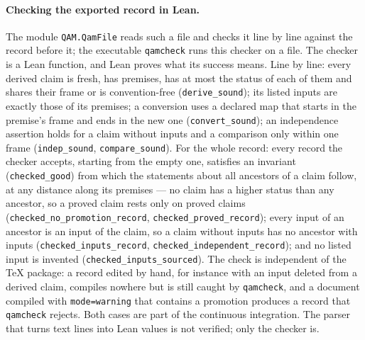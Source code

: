 \paragraph{Checking the exported record in Lean.}  The module \texttt{QAM.QamFile} reads such a file and checks it line by line
against the record before it; the executable \texttt{qamcheck} runs this checker on a file.  The checker is a Lean function, and Lean
proves what its success means.  Line by line: every derived claim is fresh, has premises, has at most the status of each of them and
shares their frame or is convention-free (\texttt{derive\_sound}); its listed inputs are exactly those of its premises; a conversion uses a
declared map that starts in the premise's frame and ends in the new one (\texttt{convert\_sound}); an independence assertion holds for a
claim without inputs and a comparison only within one frame (\texttt{indep\_sound}, \texttt{compare\_sound}).  For the whole record:
every record the checker accepts, starting from the empty one, satisfies an invariant (\texttt{checked\_good}) from which the statements
about all ancestors of a claim follow, at any distance along its premises --- no claim has a higher status than any ancestor, so a
proved claim rests only on proved claims (\texttt{checked\_no\_promotion\_record}, \texttt{checked\_proved\_record}); every input of
an ancestor is an input of the claim, so a claim without inputs has no ancestor with inputs (\texttt{checked\_inputs\_record},
\texttt{checked\_independent\_record}); and no listed input is invented (\texttt{checked\_inputs\_sourced}).  The check is independent of
the \TeX{} package: a record edited by hand, for instance with an input deleted from a derived claim, compiles nowhere but is still
caught by \texttt{qamcheck}, and a document compiled with \verb|mode=warning| that contains a promotion produces a record that
\texttt{qamcheck} rejects.  Both cases are part of the continuous integration.  The parser that turns text lines into Lean values is
not verified; only the checker is.

